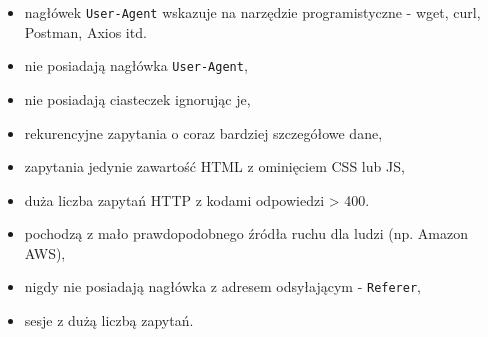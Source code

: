 \begin{itemize}
    \item nagłówek \texttt{User-Agent} wskazuje na narzędzie programistyczne - wget, curl, Postman, Axios itd.
    \item nie posiadają nagłówka \texttt{User-Agent},
    \item nie posiadają ciasteczek ignorując je,
    \item rekurencyjne zapytania o coraz bardziej szczegółowe dane,
    \item zapytania jedynie zawartość HTML z ominięciem CSS lub JS,
    \item duża liczba zapytań HTTP z kodami odpowiedzi > 400.
    \item pochodzą z mało prawdopodobnego źródła ruchu dla ludzi (np.  Amazon AWS),
    \item nigdy nie posiadają nagłówka z adresem odsyłającym - \texttt{Referer},
    \item sesje z dużą liczbą zapytań\cite{bot-buster}.
\end{itemize}
